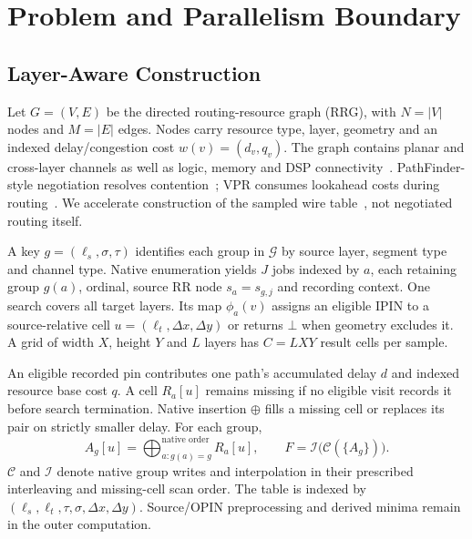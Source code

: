 \section{Problem and Parallelism Boundary}
\subsection{Layer-Aware Construction}
Let $G=(V,E)$ be the directed routing-resource graph (RRG), with $N=|V|$ nodes and $M=|E|$ edges. Nodes carry resource type, layer, geometry and an indexed delay/congestion cost $w(v)=(d_v,q_v)$. The graph contains planar and cross-layer channels as well as logic, memory and DSP connectivity~\cite{third_dimension,multidie}. PathFinder-style negotiation resolves contention~\cite{pathfinder}; VPR consumes lookahead costs during routing~\cite{vtr8,vtr9}. We accelerate construction of the sampled wire table~\cite{diversity}, not negotiated routing itself.

A key $g=(\ell_s,\sigma,\tau)$ identifies each group in $\mathcal G$ by source layer, segment type and channel type. Native enumeration yields $J$ jobs indexed by $a$, each retaining group $g(a)$, ordinal, source RR node $s_a=s_{g,j}$ and recording context. One search covers all target layers. Its map $\phi_a(v)$ assigns an eligible IPIN to a source-relative cell $u=(\ell_t,\Delta x,\Delta y)$ or returns $\bot$ when geometry excludes it. A grid of width $X$, height $Y$ and $L$ layers has $C=LXY$ result cells per sample.

An eligible recorded pin contributes one path's accumulated delay $d$ and indexed resource base cost $q$. A cell $R_a[u]$ remains missing if no eligible visit records it before search termination. Native insertion $\oplus$ fills a missing cell or replaces its pair on strictly smaller delay. For each group,
\begin{equation}
 A_g[u]=\mathop{\bigoplus}_{a:g(a)=g}^{\text{native order}}R_a[u],\qquad
 F=\mathcal I\bigl(\mathcal C(\{A_g\})\bigr).
\end{equation}
$\mathcal C$ and $\mathcal I$ denote native group writes and interpolation in their prescribed interleaving and missing-cell scan order. The table is indexed by $(\ell_s,\ell_t,\tau,\sigma,\Delta x,\Delta y)$. Source/OPIN preprocessing and derived minima remain in the outer computation.

